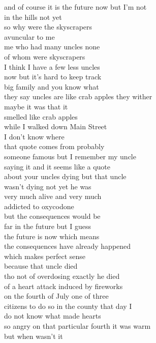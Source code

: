 \begin{flushleft}
\begin{paracol}{3}
and of course it is the future now but I’m not\\
in the hills not yet\\
so why were the skyscrapers\\
avuncular to me\\
me who had many uncles none\\
of whom were skyscrapers\\
I think I have a few less uncles\\
now but it’s hard to keep track\\
big family and you know what\\
they say uncles are like crab apples they wither\\
maybe it was that it\\
smelled like crab apples\\
while I walked down Main Street\\
\switchcolumn[2]
I don’t know where\\
that quote comes from probably\\
someone famous but I remember my uncle\\
saying it and it seems like a quote\\
about your uncles dying but that uncle\\
wasn’t dying not yet he was\\
very much alive and very much\\
addicted to oxycodone\\
but the consequences would be\\
far in the future but I guess\\
the future is now which means\\
the consequences have already happened\\
which makes perfect sense\\
because that uncle died\\
tho not of overdosing exactly he died\\
of a heart attack induced by fireworks\\
on the fourth of July one of three\\
citizens to do so in the county that day I\\
do not know what made hearts\\
so angry on that particular fourth it was warm\\
but when wasn’t it\\
\end{paracol}
\end{flushleft}
\vfill
\hspace{0pt}